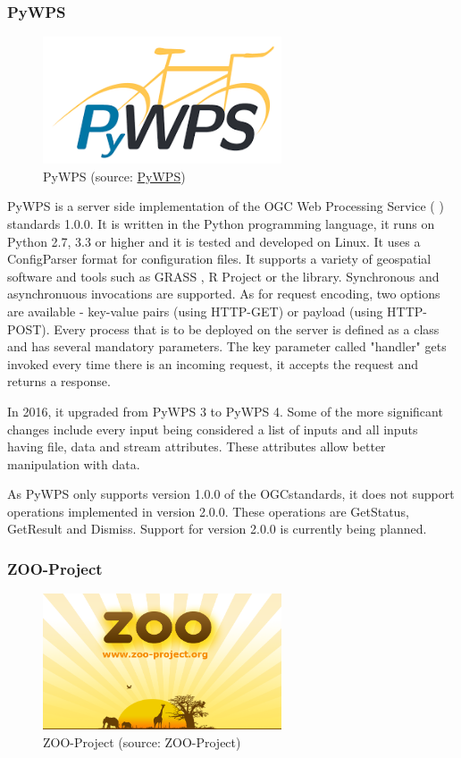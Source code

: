 \subsubsection{PyWPS}
\begin{figure}[H] \centering
      \includegraphics[width=200pt]{./pictures/pywps.png}
      \caption[PyWPS logo]{PyWPS (source:
\href{http://pywps.org/images/pywps.png}{PyWPS})}
      \label{fig:PyWPS}
  \end{figure}

PyWPS is a server side implementation of the OGC Web Processing
Service ( ) standards 1.0.0. It is written in the Python
programming language, it runs on Python 2.7, 3.3 or higher and it is
tested and developed on Linux. \cite{pywpsinfo} It uses a ConfigParser format for
configuration files.\cite{pywpsconf} It supports a variety of geospatial software and
tools such as GRASS , R Project or the  library. Synchronous
and asynchronuous invocations are supported. As for request encoding,
two options are available - key-value pairs (using HTTP-GET) or 
payload (using HTTP-POST). Every process that is to be deployed on the
server is defined as a class and has several mandatory parameters. The
key parameter called "handler" gets invoked every time there is an
incoming request, it accepts the request and returns a response.

In 2016, it upgraded from PyWPS 3 to PyWPS 4. Some of the more
significant changes include every input being considered a list of
inputs and all inputs having file, data and stream attributes. \cite{pywps3to4} These
attributes allow better manipulation with data.
	
As PyWPS only supports version 1.0.0 of the OGCstandards, it does
not support operations implemented in version 2.0.0. These operations
are GetStatus, GetResult and Dismiss. Support for version 2.0.0 is
currently being planned.\cite{pywps}
 

\subsubsection{ZOO-Project}
\begin{figure}[H] \centering
      \includegraphics[width=200pt]{./pictures/zoo.png}
      \caption[ZOO-Project logo]{ZOO-Project (source: ZOO-Project)}
      \label{fig:ZOO-Project}
  \end{figure}

